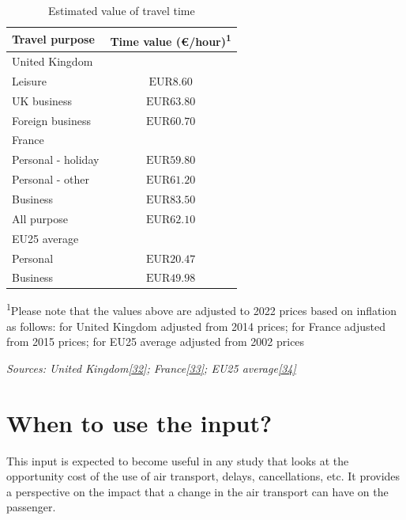 \documentclass[
  11pt,
  a4paper,
]{book}
\begin{document}
\hypertarget{tbl-pas-value-of-time}{}
\setlength{\LTpost}{0mm}
\begin{longtable}{lc}
\caption{\label{tbl-pas-value-of-time}Estimated value of travel time }\tabularnewline

\toprule
Travel purpose & Time value (€/hour)\textsuperscript{1} \\ 
\midrule
\multicolumn{2}{l}{United Kingdom} \\ 
\midrule
Leisure & $\text{EUR}8.60$ \\ 
UK business & $\text{EUR}63.80$ \\ 
Foreign business & $\text{EUR}60.70$ \\ 
\midrule
\multicolumn{2}{l}{France} \\ 
\midrule
Personal - holiday & $\text{EUR}59.80$ \\ 
Personal - other & $\text{EUR}61.20$ \\ 
Business & $\text{EUR}83.50$ \\ 
All purpose & $\text{EUR}62.10$ \\ 
\midrule
\multicolumn{2}{l}{EU25 average} \\ 
\midrule
Personal & $\text{EUR}20.47$ \\ 
Business & $\text{EUR}49.98$ \\ 
\bottomrule
\end{longtable}
\begin{minipage}{\linewidth}
\textsuperscript{1}Please note that the values above are adjusted to 2022 prices based on inflation as follows: for United Kingdom adjusted from 2014 prices; for France adjusted from 2015 prices; for EU25 average adjusted from 2002 prices\\
\end{minipage}

\emph{Sources: United
Kingdom\protect\hyperlink{ref-aptcom2014}{{[}32{]}};
France\protect\hyperlink{ref-frminecotra2019}{{[}33{]}}; EU25
average\protect\hyperlink{ref-heatco2006}{{[}34{]}}}

\hypertarget{when-to-use-the-input-8}{%
\section{When to use the input?}\label{when-to-use-the-input-8}}

This input is expected to become useful in any study that looks at the
opportunity cost of the use of air transport, delays, cancellations,
etc. It provides a perspective on the impact that a change in the air
transport can have on the passenger.
\end{document}
